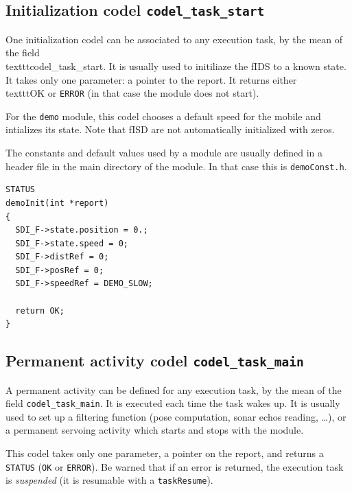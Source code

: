\subsection{Initialization codel \texttt{codel\_task\_start}}

One initialization codel can be associated to any  execution task, by the
mean of the field \\texttt{codel\_task\_start}. It is  usually used to initiliaze
the fIDS to a known state. It takes only one  parameter: a pointer to the
report.   It returns either \\texttt{OK}  or \texttt{ERROR}  (in  that case the
module does not start).

For the \texttt{demo} module,  this codel chooses  a  default speed for  the
mobile  and intializes its state.   Note  that fISD are not automatically
initialized with zeros.

The constants and default values used by a  module are usually defined in
a header file in the main directory  of the module. In  that case this is
\texttt{demoConst.h}.

\begin{center}\begin{cartouche}\small\begin{verbatim}
STATUS
demoInit(int *report)
{
  SDI_F->state.position = 0.;
  SDI_F->state.speed = 0;
  SDI_F->distRef = 0;
  SDI_F->posRef = 0;
  SDI_F->speedRef = DEMO_SLOW;

  return OK;
}
\end{verbatim}\end{cartouche}\end{center}


\subsection{Permanent activity codel \texttt{codel\_task\_main}}

A permanent activity can  be defined for  any execution task, by the mean
of the  field  \texttt{codel\_task\_main}.  It is executed  each  
time the task  wakes up. 
It is usually used to set up a  filtering function (pose computation,
sonar echos  reading, \ldots), or   a permanent  servoing activity  which
starts and stops with the module.

This codel takes only one parameter, a pointer on the report, and returns
a \texttt{STATUS} (\texttt{OK} or \texttt{ERROR}).  Be warned that  if an error is
returned, the execution task  is \emph{suspended} (it  is resumable with a
\texttt{taskResume}).

